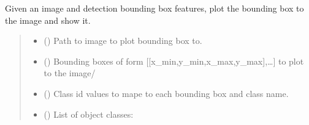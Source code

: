 \documentclass[letterpaper,10pt,english]{sphinxmanual}
\begin{document}
\begin{fulllineitems}
\begin{fulllineitems}
\end{fulllineitems}


\begin{fulllineitems}
\label{\detokenize{comp_viz.utils:comp_viz.utils.toolbox.ObjectDetection.show_pred_bboxes_image}}
\pysigstartsignatures
{}
\pysigstopsignatures
\sphinxAtStartPar
Given an image and detection bounding box features, plot the bounding box to the image and show it.
\begin{quote}\begin{description}
\begin{itemize}
\item {} 
\sphinxAtStartPar
{} () \textendash{} Path to image to plot bounding box to.

\item {} 
\sphinxAtStartPar
{} (\sphinxstyleliteralemphasis{\sphinxupquote{{[}}}\sphinxstyleliteralemphasis{\sphinxupquote{{]}}}) \textendash{} Bounding boxes of form {[}{[}x\_min,y\_min,x\_max,y\_max{]},…{]} to plot to the image/

\item {} 
\sphinxAtStartPar
{} (\sphinxstyleliteralemphasis{\sphinxupquote{{[}}}\sphinxstyleliteralemphasis{\sphinxupquote{{]}}}) \textendash{} Class id values to mape to each bounding box and class name.

\item {} 
\sphinxAtStartPar
{} (\sphinxstyleliteralemphasis{\sphinxupquote{{[}}}\sphinxstyleliteralemphasis{\sphinxupquote{{]}}}) \textendash{} List of object classes:


\end{itemize}
\end{description}
\end{quote}
\end{fulllineitems}
\end{fulllineitems}
\end{document}
